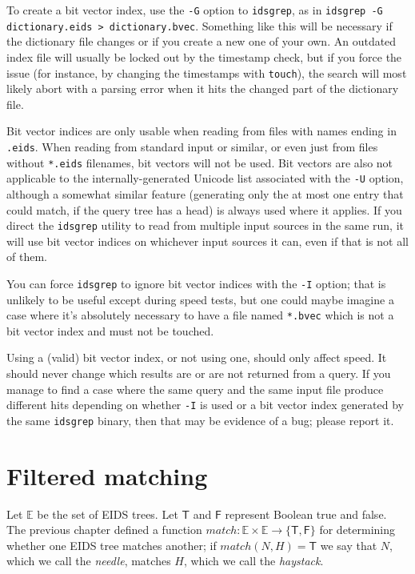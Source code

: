 \documentclass[twocolumn]{report}
\newcommand{\DangerousSection}{\marginpar{\large\hfill
\raisebox{-0.5\baselineskip}[0pt][0pt]{\dbend}\hfill\null}}
\begin{document}
To create a bit vector index, use the \texttt{-G} option to
\texttt{idsgrep}, as in \texttt{idsgrep -G dictionary.eids >
dictionary.bvec}.  Something like this will be necessary if the dictionary
file changes or if you create a new one of your own.  An outdated index file
will usually be locked out by the timestamp check, but if you force the
issue (for instance, by changing the timestamps with \texttt{touch}), the
search will most likely abort with a parsing error when it hits the changed
part of the dictionary file.

Bit vector indices are only usable when reading from files with names ending
in \texttt{.eids}.  When reading from standard input or similar, or even
just from files without \texttt{*.eids} filenames, bit vectors will not be
used.  Bit vectors are also not applicable to the internally-generated
Unicode list associated with the \texttt{-U} option, although a somewhat
similar feature (generating only the at most one entry that could match, if
the query tree has a head) is always used where it applies.  If you direct
the \texttt{idsgrep} utility to read from multiple input sources in the same
run, it will use bit vector indices on whichever input sources it can, even
if that is not all of them.

You can force \texttt{idsgrep} to ignore bit vector indices with the
\texttt{-I} option; that is unlikely to be useful except during speed tests,
but one could maybe imagine a case where it's absolutely necessary to have a
file named \texttt{*.bvec} which is not a bit vector index and must not be
touched.

Using a (valid) bit vector index, or not using one, should only affect
speed.  It should never change which results are or are not returned from a
query.  If you manage to find a case where the same query and the same input
file produce different hits depending on whether \texttt{-I} is used or a
bit vector index generated by the same \texttt{idsgrep} binary, then that
may be evidence of a bug; please report it.


\section{Filtered matching}\DangerousSection

Let $\mathbb{E}$ be the set of EIDS trees.  Let $\mathsf{T}$
and $\mathsf{F}$ represent Boolean true and false.  The previous chapter
defined a function $\mathit{match}:\mathbb{E}\times\mathbb{E}\rightarrow
\{\mathsf{T},\mathsf{F}\}$ for determining whether one EIDS tree matches
another; if $\mathit{match}(N,H)=\mathsf{T}$ we say that $N$, which we call
the \emph{needle}, matches $H$, which we call the \emph{haystack}.
\end{document}
